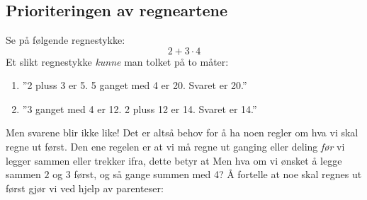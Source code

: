 




\section{\rrek}
\subsection*{Prioriteringen av regneartene}
Se på følgende regnestykke:
\[ 2+3\cdot4 \]
Et slikt regnestykke \textsl{kunne} man tolket på to måter:
\begin{enumerate}[label=(\roman*)]
	\item ''2 pluss 3 er 5. 5 ganget med 4 er 20. Svaret er 20.''
	\item ''3 ganget med 4 er 12. 2 pluss 12 er 14. Svaret er 14.''
\end{enumerate}
Men svarene blir ikke like! Det er altså behov for å ha noen regler om hva vi skal regne ut først. Den ene regelen er at vi må regne ut ganging eller deling \textsl{før} vi legger sammen eller trekker ifra, dette betyr at \regv
\st{ \vs
{}
}
Men hva om vi ønsket å legge sammen $ 2 $ og $ 3 $ først, og så gange summen med 4? Å fortelle at noe skal regnes ut først gjør vi ved hjelp av parenteser: \regv
\st{\vs
{}
}\regv

\newpage
{}
